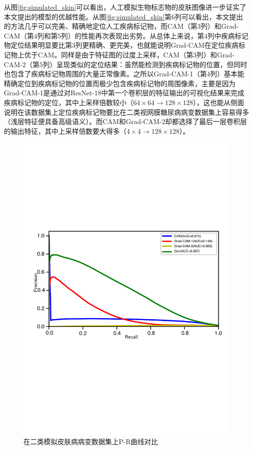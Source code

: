 从图\ref{fig:simulated_skin}可以看出，人工模拟生物标志物的皮肤图像进一步证实了本文提出的模型的优越性能。从图\ref{fig:simulated_skin}第$6$列可以看出，本文提出的方法几乎可以完美、精确地定位人工疾病标记物，而CAM（第$3$列）和Grad-CAM（第$4$列和第$5$列）的性能再次表现出劣势。从总体上来说，第$4$列中疾病标记物定位结果明显要比第$3$列更精确、更完美，也就能说明Grad-CAM在定位疾病标记物上优于CAM。同样是由于特征图的过度上采样，CAM（第$3$列）和Grad-CAM-2（第$5$列）呈现类似的定位结果：虽然能检测到疾病标记物的位置，但同时也包含了疾病标记物周围的大量正常像素。之所以Grad-CAM-1（第$4$列）基本能精确定位到疾病标记物的位置而极少包含疾病标记物的周围像素，主要是因为Grad-CAM-1是通过对ResNet-18中第一个卷积层的特征输出的可视化结果来完成疾病标记物的定位，其中上采样倍数较小（$64\times 64\rightarrow 128\times 128$），这也能从侧面说明在该数据集上定位疾病标记物要比在二类视网膜糖尿病病变数据集上容易得多（浅层特征便具备高级语义）。而CAM和Grad-CAM-2却都选择了最后一层卷积层的输出特征，其中上采样倍数要大得多（$4\times4\rightarrow 128\times 128$）。
\begin{figure}[h]
	\centering
	\includegraphics[width=1.0\textwidth]{figure/pr_curve_skin_image/pr_curve}
	\caption{在二类模拟皮肤病病变数据集上P-R曲线对比}
	\label{fig:simulated_skin_pr_curve}
\end{figure}

